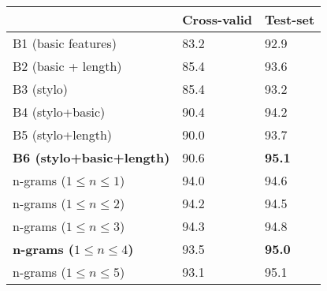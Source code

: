 \begin{tabular}{l|ll}
~ & Cross-valid & Test-set\\
\hline
B1 (basic features)     & 83.2  &92.9   \\
B2 (basic + length)     & 85.4&93.6  \\
B3 (stylo)              & 85.4&93.2      \\
B4 (stylo+basic)         & 90.4  &94.2  \\
B5 (stylo+length)       & 90.0  &93.7  \\
\textbf{B6 (stylo+basic+length)}       & 90.6  &\textbf{95.1}  \\
\hline
n-grams ($1\le n \le 1$) &94.0  &94.6\\
n-grams ($1\le n \le 2$) &94.2  &94.5\\
n-grams ($1\le n \le 3$) &94.3  &94.8\\
\textbf{n-grams ($1\le n \le 4$)} &93.5  &\textbf{95.0    }\\
n-grams ($1\le n \le 5$) &93.1  &95.1\\

\end{tabular}